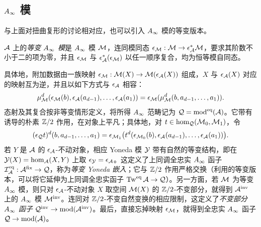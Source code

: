 \subsection{\texorpdfstring{$A_\infty$}{A∞} 模}\label{sec:6c}
与上面对扭曲复形的讨论相对应，也可以引入 $A_\infty$ 模的等变版本。
\begin{definition*}
$\mathcal A$ 上的\emph{等变 $A_\infty$ 模}是 $A_\infty$ 模 $\mathcal M$，连同模同态 $\epsilon_{\mathcal M}:\mathcal M\to\epsilon_{\mathcal A}^*\mathcal M$，要求其阶数不小于二的项为零，并且 $\epsilon_{\mathcal M}$ 与 $\epsilon_{\mathcal A}^*(\epsilon_{\mathcal M})$ 以任一顺序复合，均为恒等模自同态。
\end{definition*}
具体地，附加数据由一族映射 $\epsilon_{\mathcal M}:\mathcal M(X)\to\mathcal M(\epsilon_{\mathcal A}(X))$ 组成，$X$ 与 $\epsilon_{\mathcal A}(X)$ 对应的映射互为逆，并且以如下方式与 $\epsilon_{\mathcal A}$ 相容：
\[
\mu^d_{\mathcal M}(\epsilon_{\mathcal M}(b),\epsilon_{\mathcal A}(a_{d-1}),\ldots,\epsilon_{\mathcal A}(a_1))=\epsilon_{\mathcal M}(\mu^d_{\mathcal M}(b,a_{d-1},\ldots,a_1)).
\]
态射及其复合按非等变情形定义，将所得 $A_\infty$ 范畴记为 $\mathcal Q=\operatorname{mod}^{\mathrm{eq}}(\mathcal A)$。它带有诱导的朴素 $\mathbb Z/2$
作用，在对象上平凡；具体地，对 $t\in\hom_{\mathcal Q}(\mathcal M_0,\mathcal M_1)$，令
\[
(\epsilon_{\mathcal Q}t)^d(b,a_{d-1},\ldots,a_1)=\epsilon_{\mathcal M_1}\bigl(t^d(\epsilon_{\mathcal M_0}(b),\epsilon_{\mathcal A}(a_{d-1}),\ldots,\epsilon_{\mathcal A}(a_1))\bigr).
\]
若 $Y$ 是 $\mathcal A$ 的 $\epsilon_{\mathcal A}$-不动对象，相应 Yoneda 模 $\mathcal Y$ 带有自然的等变结构，即在 $\mathcal Y(X)=\hom_{\mathcal A}(X,Y)$ 上取 $\epsilon_{\mathcal Y}=\epsilon_{\mathcal A}$。这定义了上同调全忠实 $A_\infty$ 函子 $\mathcal I_{\mathcal A}^{\mathrm{eq}}:\mathcal A^{\mathrm{fix}}\to\mathcal Q$，称为\emph{等变 Yoneda 嵌入}；它与 $\mathbb Z/2$ 作用严格交换（利用的等变版本，可以将它延伸为上同调全忠实函子 $\operatorname{Tw}^{\mathrm{eq}}\mathcal A\to\mathcal Q$）。另一方面，若 $\mathcal M$ 为等变 $A_\infty$ 模，则只对 $\epsilon_{\mathcal A}$-不动对象 $X$ 取空间 $\mathcal M(X)$ 的 $\mathbb Z/2$-不变部分，就得到 $\mathcal A^{\mathrm{inv}}$ 上的 $A_\infty$ 模 $\mathcal M^{\mathrm{inv}}$。连同对 $\mathbb Z/2$-不变自然变换的相应限制，这定义了\emph{不变部分 $A_\infty$ 函子} $\mathcal Q^{\mathrm{inv}}\to\operatorname{mod}(\mathcal A^{\mathrm{inv}})$。最后，直接忘掉映射 $\epsilon_{\mathcal M}$，就得到全忠实 $A_\infty$ 函子 $\mathcal Q\to\operatorname{mod}(\mathcal A)$。

